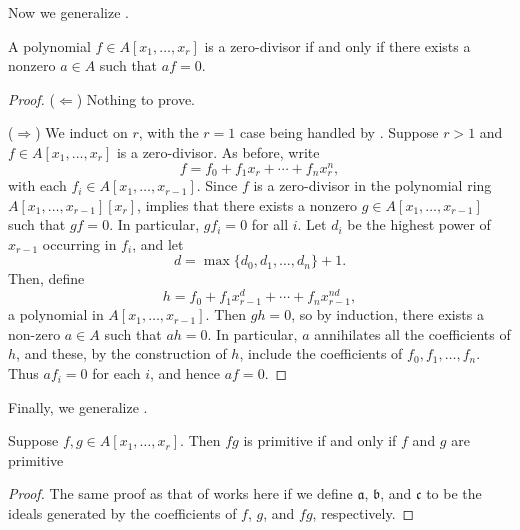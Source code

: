 \begin{solution}
Now we generalize .

\begin{claim}
\label{claim:1.3.iii}
A polynomial \(f\in A[x_1, \ldots, x_r]\) is a zero-divisor if and only if there exists a nonzero \(a \in A\) such that \(a f = 0\).
\end{claim}

\begin{proof}
(\(\Leftarrow\))
Nothing to prove.

(\(\Rightarrow\))
We induct on \(r\), with the \(r = 1\) case being handled by .
Suppose \(r > 1\) and \(f \in A[x_1, \ldots, x_r]\) is a zero-divisor.
As before, write
\begin{equation*}
f = f_0 + f_1 x_r + \cdots + f_n x_r^n,
\end{equation*}
with each \(f_i \in A[x_1, \ldots, x_{r-1}]\).
Since \(f\) is a zero-divisor in the polynomial ring \(A[x_1, \ldots, x_{r-1}][x_r]\),  implies that there exists a nonzero \(g \in A[x_1, \ldots, x_{r-1}]\) such that \(g f = 0\).
In particular, \(g f_i = 0\) for all \(i\).
Let \(d_i\) be the highest power of \(x_{r-1}\) occurring in \(f_i\), and let
\begin{equation*}
d = \max\{d_0, d_1, \ldots, d_n\} + 1.
\end{equation*}
Then, define
\begin{equation*}
h
= f_0 + f_1 x_{r-1}^d + \cdots + f_n x_{r-1}^{n d},
\end{equation*}
a polynomial in \(A[x_1, \ldots, x_{r-1}]\).
Then \(g h = 0\), so by induction, there exists a non-zero \(a \in A\) such that \(a h = 0\).
In particular, \(a\) annihilates all the coefficients of \(h\), and these, by the construction of \(h\), include the coefficients of \(f_0, f_1, \ldots, f_n\).
Thus \(a f_i = 0\) for each \(i\), and hence \(a f = 0\).
\end{proof}

Finally, we generalize .

\begin{claim}
\label{claim:1.3.iv}
Suppose \(f, g \in A[x_1, \ldots, x_r]\).
Then \(f g\) is primitive if and only if \(f\) and \(g\) are primitive
\end{claim}

\begin{proof}
The same proof as that of  works here if we define \(\mathfrak a\), \(\mathfrak b\), and \(\mathfrak c\) to be the ideals generated by the coefficients of \(f\), \(g\), and \(f g\), respectively.
\end{proof}
\let\qed\relax
\end{solution}
